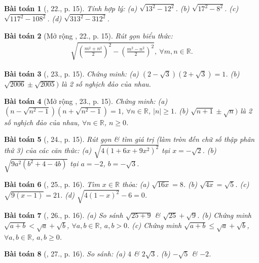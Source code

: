 \documentclass{article}
\newtheorem{baitoan}{Bài toán}
\begin{document}
\begin{baitoan}[\cite{SGK_Toan_9_tap_1}, 22., p. 15]
	Tính hợp lý: (a) $\sqrt{13^2 - 12^2}$. (b) $\sqrt{17^2 - 8^2}$. (c) $\sqrt{117^2 - 108^2}$. (d) $\sqrt{313^2 - 312^2}$.
\end{baitoan}

\begin{baitoan}[Mở rộng \cite{SGK_Toan_9_tap_1}, 22., p. 15]
	Rút gọn biểu thức:
	\begin{align*}
		\sqrt{\left(\frac{m^2 + n^2}{2}\right)^2 - \left(\frac{m^2 - n^2}{2}\right)^2},\ \forall m,n\in\mathbb{R}.
	\end{align*}
\end{baitoan}

\begin{baitoan}[\cite{SGK_Toan_9_tap_1}, 23., p. 15]
	Chứng minh: (a) $(2 - \sqrt{3})(2 + \sqrt{3}) = 1$. (b) $\sqrt{2006}\pm\sqrt{2005})$ là 2 số nghịch đảo của nhau.
\end{baitoan}

\begin{baitoan}[Mở rộng \cite{SGK_Toan_9_tap_1}, 23., p. 15]
	Chứng minh: (a) $(n - \sqrt{n^2 - 1})(n + \sqrt{n^2 - 1}) = 1$, $\forall n\in\mathbb{R}$, $|n|\ge1$. (b) $\sqrt{n + 1}\pm\sqrt{n})$ là 2 số nghịch đảo của nhau, $\forall n\in\mathbb{R}$, $n\ge0$.
\end{baitoan}

\begin{baitoan}[\cite{SGK_Toan_9_tap_1}, 24., p. 15]
	Rút gọn \& tìm giá trị (làm tròn đến chữ số thập phân thứ 3) của các căn thức: (a) $\sqrt{4(1 + 6x + 9x^2)^2}$ tại $x = -\sqrt{2}$. (b) $\sqrt{9a^2(b^2 + 4 - 4b)}$ tại $a = -2$, $b = -\sqrt{3}$. 
\end{baitoan}

\begin{baitoan}[\cite{SGK_Toan_9_tap_1}, 25., p. 16]
	Tìm $x\in\mathbb{R}$ thỏa: (a) $\sqrt{16x} = 8$. (b) $\sqrt{4x} = \sqrt{5}$. (c) $\sqrt{9(x - 1)} = 21$. (d) $\sqrt{4(1 - x)^2} - 6 = 0$.
\end{baitoan}

\begin{baitoan}[\cite{SGK_Toan_9_tap_1}, 26., p. 16]
	(a) So sánh $\sqrt{25 + 9}$ \& $\sqrt{25} + \sqrt{9}$. (b) Chứng minh $\sqrt{a + b} < \sqrt{a} + \sqrt{b}$, $\forall a,b\in\mathbb{R}$, $a,b > 0$. (c) Chứng minh $\sqrt{a + b}\le\sqrt{a} + \sqrt{b}$, $\forall a,b\in\mathbb{R}$, $a,b\ge0$.
\end{baitoan}

\begin{baitoan}[\cite{SGK_Toan_9_tap_1}, 27., p. 16]
	So sánh: (a) $4$ \& $2\sqrt{3}$. (b) $-\sqrt{5}$ \& $-2$.
\end{baitoan}
\end{document}
